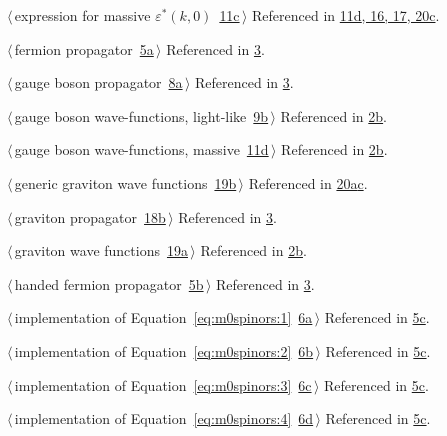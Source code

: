 \documentclass[a4paper,12pt]{amsart}
\renewcommand{\NWlink}[2]{\hyperlink{#1}{#2}}
\renewcommand{\NWtxtRefIn}{Referenced in}
\begin{document}
{\begin{list}{}{\setlength{\itemsep}{-\parsep}\setlength{\itemindent}{-\leftmargin}}
{}
\item $\langle\,$expression for massive $\varepsilon^\ast(k, 0)$\nobreak\ {\footnotesize \NWlink{nuweb11c}{11c}}$\,\rangle$ {\footnotesize {\NWtxtRefIn} \NWlink{nuweb11d}{11d}\NWlink{nuweb16}{, 16}\NWlink{nuweb17}{, 17}\NWlink{nuweb20c}{, 20c}.
}
\item $\langle\,$fermion propagator\nobreak\ {\footnotesize \NWlink{nuweb5a}{5a}}$\,\rangle$ {\footnotesize {\NWtxtRefIn} \NWlink{nuweb3}{3}.}
\item $\langle\,$gauge boson propagator\nobreak\ {\footnotesize \NWlink{nuweb8a}{8a}}$\,\rangle$ {\footnotesize {\NWtxtRefIn} \NWlink{nuweb3}{3}.}
\item $\langle\,$gauge boson wave-functions, light-like\nobreak\ {\footnotesize \NWlink{nuweb9b}{9b}}$\,\rangle$ {\footnotesize {\NWtxtRefIn} \NWlink{nuweb2b}{2b}.}
\item $\langle\,$gauge boson wave-functions, massive\nobreak\ {\footnotesize \NWlink{nuweb11d}{11d}}$\,\rangle$ {\footnotesize {\NWtxtRefIn} \NWlink{nuweb2b}{2b}.}
\item $\langle\,$generic graviton wave functions\nobreak\ {\footnotesize \NWlink{nuweb19b}{19b}}$\,\rangle$ {\footnotesize {\NWtxtRefIn} \NWlink{nuweb20a}{20a}\NWlink{nuweb20c}{c}.
}
\item $\langle\,$graviton propagator\nobreak\ {\footnotesize \NWlink{nuweb18b}{18b}}$\,\rangle$ {\footnotesize {\NWtxtRefIn} \NWlink{nuweb3}{3}.}
\item $\langle\,$graviton wave functions\nobreak\ {\footnotesize \NWlink{nuweb19a}{19a}}$\,\rangle$ {\footnotesize {\NWtxtRefIn} \NWlink{nuweb2b}{2b}.}
\item $\langle\,$handed fermion propagator\nobreak\ {\footnotesize \NWlink{nuweb5b}{5b}}$\,\rangle$ {\footnotesize {\NWtxtRefIn} \NWlink{nuweb3}{3}.}
\item $\langle\,$implementation of Equation~\eqref{eq:m0spinors:1}\nobreak\ {\footnotesize \NWlink{nuweb6a}{6a}}$\,\rangle$ {\footnotesize {\NWtxtRefIn} \NWlink{nuweb5c}{5c}.}
\item $\langle\,$implementation of Equation~\eqref{eq:m0spinors:2}\nobreak\ {\footnotesize \NWlink{nuweb6b}{6b}}$\,\rangle$ {\footnotesize {\NWtxtRefIn} \NWlink{nuweb5c}{5c}.}
\item $\langle\,$implementation of Equation~\eqref{eq:m0spinors:3}\nobreak\ {\footnotesize \NWlink{nuweb6c}{6c}}$\,\rangle$ {\footnotesize {\NWtxtRefIn} \NWlink{nuweb5c}{5c}.}
\item $\langle\,$implementation of Equation~\eqref{eq:m0spinors:4}\nobreak\ {\footnotesize \NWlink{nuweb6d}{6d}}$\,\rangle$ {\footnotesize {\NWtxtRefIn} \NWlink{nuweb5c}{5c}.}

\end{list}}
\end{document}
